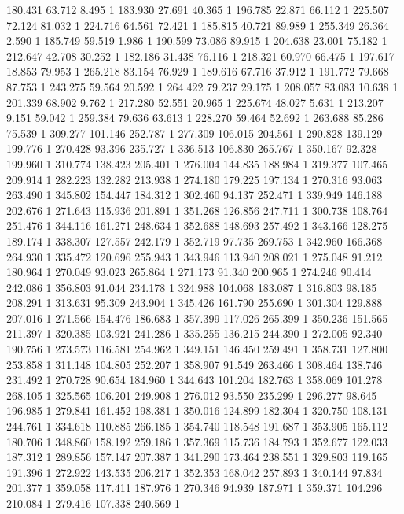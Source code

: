 	180.431	63.712	8.495	1
	183.930	27.691	40.365	1
	196.785	22.871	66.112	1
	225.507	72.124	81.032	1
	224.716	64.561	72.421	1
	185.815	40.721	89.989	1
	255.349	26.364	2.590	1
	185.749	59.519	1.986	1
	190.599	73.086	89.915	1
	204.638	23.001	75.182	1
	212.647	42.708	30.252	1
	182.186	31.438	76.116	1
	218.321	60.970	66.475	1
	197.617	18.853	79.953	1
	265.218	83.154	76.929	1
	189.616	67.716	37.912	1
	191.772	79.668	87.753	1
	243.275	59.564	20.592	1
	264.422	79.237	29.175	1
	208.057	83.083	10.638	1
	201.339	68.902	9.762	1
	217.280	52.551	20.965	1
	225.674	48.027	5.631	1
	213.207	9.151	59.042	1
	259.384	79.636	63.613	1
	228.270	59.464	52.692	1
	263.688	85.286	75.539	1
	309.277	101.146	252.787	1
	277.309	106.015	204.561	1
	290.828	139.129	199.776	1
	270.428	93.396	235.727	1
	336.513	106.830	265.767	1
	350.167	92.328	199.960	1
	310.774	138.423	205.401	1
	276.004	144.835	188.984	1
	319.377	107.465	209.914	1
	282.223	132.282	213.938	1
	274.180	179.225	197.134	1
	270.316	93.063	263.490	1
	345.802	154.447	184.312	1
	302.460	94.137	252.471	1
	339.949	146.188	202.676	1
	271.643	115.936	201.891	1
	351.268	126.856	247.711	1
	300.738	108.764	251.476	1
	344.116	161.271	248.634	1
	352.688	148.693	257.492	1
	343.166	128.275	189.174	1
	338.307	127.557	242.179	1
	352.719	97.735	269.753	1
	342.960	166.368	264.930	1
	335.472	120.696	255.943	1
	343.946	113.940	208.021	1
	275.048	91.212	180.964	1
	270.049	93.023	265.864	1
	271.173	91.340	200.965	1
	274.246	90.414	242.086	1
	356.803	91.044	234.178	1
	324.988	104.068	183.087	1
	316.803	98.185	208.291	1
	313.631	95.309	243.904	1
	345.426	161.790	255.690	1
	301.304	129.888	207.016	1
	271.566	154.476	186.683	1
	357.399	117.026	265.399	1
	350.236	151.565	211.397	1
	320.385	103.921	241.286	1
	335.255	136.215	244.390	1
	272.005	92.340	190.756	1
	273.573	116.581	254.962	1
	349.151	146.450	259.491	1
	358.731	127.800	253.858	1
	311.148	104.805	252.207	1
	358.907	91.549	263.466	1
	308.464	138.746	231.492	1
	270.728	90.654	184.960	1
	344.643	101.204	182.763	1
	358.069	101.278	268.105	1
	325.565	106.201	249.908	1
	276.012	93.550	235.299	1
	296.277	98.645	196.985	1
	279.841	161.452	198.381	1
	350.016	124.899	182.304	1
	320.750	108.131	244.761	1
	334.618	110.885	266.185	1
	354.740	118.548	191.687	1
	353.905	165.112	180.706	1
	348.860	158.192	259.186	1
	357.369	115.736	184.793	1
	352.677	122.033	187.312	1
	289.856	157.147	207.387	1
	341.290	173.464	238.551	1
	329.803	119.165	191.396	1
	272.922	143.535	206.217	1
	352.353	168.042	257.893	1
	340.144	97.834	201.377	1
	359.058	117.411	187.976	1
	270.346	94.939	187.971	1
	359.371	104.296	210.084	1
	279.416	107.338	240.569	1
